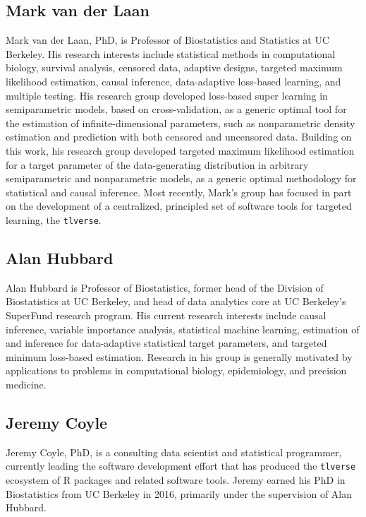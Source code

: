 \documentclass[
  12pt, krantz2,
]{book}
\newcommand{\passthrough}[1]{#1}
\theoremstyle{definition}
\theoremstyle{definition}
\theoremstyle{definition}
\newcommand{\1}{\mathbbm{1}}
\begin{document}
\hypertarget{mark-van-der-laan}{%
\subsection*{Mark van der Laan}\label{mark-van-der-laan}}


Mark van der Laan, PhD, is Professor of Biostatistics and Statistics at UC
Berkeley. His research interests include statistical methods in computational
biology, survival analysis, censored data, adaptive designs, targeted maximum
likelihood estimation, causal inference, data-adaptive loss-based learning, and
multiple testing. His research group developed loss-based super learning in
semiparametric models, based on cross-validation, as a generic optimal tool for
the estimation of infinite-dimensional parameters, such as nonparametric density
estimation and prediction with both censored and uncensored data. Building on
this work, his research group developed targeted maximum likelihood estimation
for a target parameter of the data-generating distribution in arbitrary
semiparametric and nonparametric models, as a generic optimal methodology for
statistical and causal inference. Most recently, Mark's group has focused in
part on the development of a centralized, principled set of software tools for
targeted learning, the \passthrough{\lstinline!tlverse!}.

\hypertarget{alan-hubbard}{%
\subsection*{Alan Hubbard}\label{alan-hubbard}}


Alan Hubbard is Professor of Biostatistics, former head of the Division of
Biostatistics at UC Berkeley, and head of data analytics core at UC Berkeley's
SuperFund research program. His current research interests include causal
inference, variable importance analysis, statistical machine learning,
estimation of and inference for data-adaptive statistical target parameters, and
targeted minimum loss-based estimation. Research in his group is generally
motivated by applications to problems in computational biology, epidemiology,
and precision medicine.

\hypertarget{jeremy-coyle}{%
\subsection*{Jeremy Coyle}\label{jeremy-coyle}}


Jeremy Coyle, PhD, is a consulting data scientist and statistical programmer,
currently leading the software development effort that has produced the
\passthrough{\lstinline!tlverse!} ecosystem of R packages and related software tools. Jeremy earned his
PhD in Biostatistics from UC Berkeley in 2016, primarily under the supervision
of Alan Hubbard.
\end{document}
